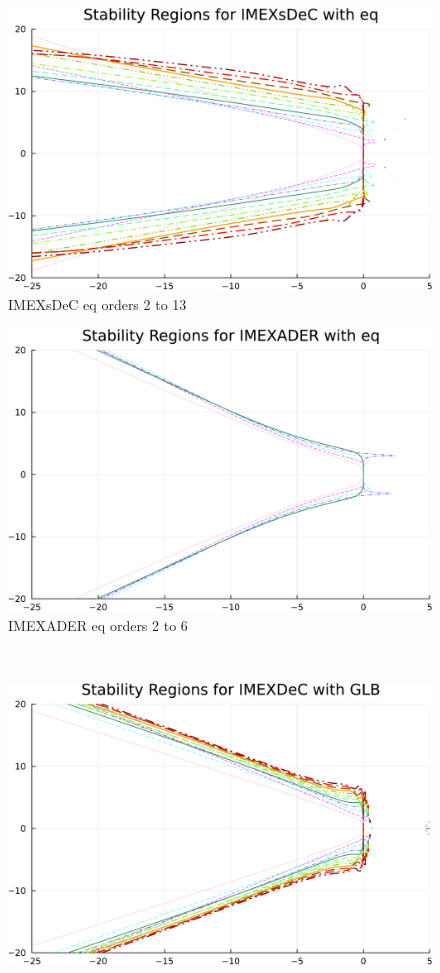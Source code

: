 \begin{figure}
\begin{minipage}[t]{0.32\textwidth}
		\centering
		\includegraphics[width=\textwidth, trim={0 0 0 22}, clip]{pdf/odepics/Minion_IMEXsDeC_eq_ord13-crop.pdf}
		IMEXsDeC eq orders 2 to 13
	\end{minipage}
	\begin{minipage}[t]{0.32\textwidth}
		\centering
		\includegraphics[width=\textwidth, trim={0 0 0 22}, clip]{pdf/odepics/Minion_IMEXADER_eq_ord6-crop.pdf}
		IMEXADER eq orders 2 to 6
	\end{minipage}\\
	\begin{minipage}[t]{0.32\textwidth}
		\centering
		\includegraphics[width=\textwidth, trim={0 0 0 22}, clip]{pdf/odepics/Minion_IMEXDeC_GLB_ord13-crop.pdf}

\end{minipage}
\end{figure}
